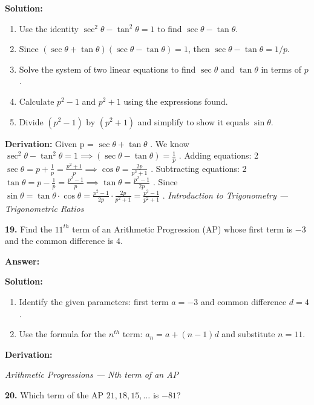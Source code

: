 \documentclass[12pt,a4paper]{exam}
\newcommand{\fitmath}[1]{%
  \sbox{\schmathbox}{$\displaystyle #1$}%
  \ifdim\wd\schmathbox>\linewidth
    \resizebox{\linewidth}{!}{\usebox{\schmathbox}}%
  \else
    \usebox{\schmathbox}%
  \fi}
\begin{document}
\begin{questions}
\textbf{Solution:}
\begin{enumerate}
  \item Use the identity $\sec^2 \theta - \tan^2 \theta = 1$ to find $\sec \theta - \tan \theta$.
  \item Since $(\sec \theta + \tan \theta)(\sec \theta - \tan \theta) = 1$, then $\sec \theta - \tan \theta = 1/p$.
  \item Solve the system of two linear equations to find $\sec \theta$ and $\tan \theta$ in terms of $p$.
  \item Calculate $p^2 - 1$ and $p^2 + 1$ using the expressions found.
  \item Divide $(p^2 - 1)$ by $(p^2 + 1)$ and simplify to show it equals $\sin \theta$.
\end{enumerate}
\textbf{Derivation:}
Given  p = $\sec \theta + \tan \theta$ . We know  $\sec^2 \theta - \tan^2 \theta = 1 \implies (\sec \theta - \tan \theta) = \frac{1}{p}$ . Adding equations:  2$\sec \theta = p + \frac{1}{p} = \frac{p^2+1}{p} \implies \cos \theta = \frac{2p}{p^2+1}$ . Subtracting equations:  2$\tan \theta = p - \frac{1}{p} = \frac{p^2-1}{p} \implies \tan \theta = \frac{p^2-1}{2p}$ . Since  $\sin \theta = \tan \theta \cdot \cos \theta = \frac{p^2-1}{2p} \cdot \frac{2p}{p^2+1} = \frac{p^2-1}{p^2+1}$ .
\hfill \textit{Introduction to Trigonometry — Trigonometric Ratios}
\vspace{0.3cm}

\question \textbf{19.} Find the $11^{th}$ term of an Arithmetic Progression (AP) whose first term is $-3$ and the common difference is $4$.

\textbf{Answer:}
\begin{center}
\fitmath{37}
\end{center}

\textbf{Solution:}
\begin{enumerate}
  \item Identify the given parameters: first term $a = -3$ and common difference $d = 4$.
  \item Use the formula for the $n^{th}$ term: $a_n = a + (n-1)d$ and substitute $n=11$.
\end{enumerate}
\textbf{Derivation:}
\begin{center}
\fitmath{a_{11} = a + (11-1)d = -3 + 10(4) = -3 + 40 = 37}
\end{center}
\hfill \textit{Arithmetic Progressions — Nth term of an AP}
\vspace{0.3cm}

\question \textbf{20.} Which term of the AP $21, 18, 15, \dots$ is $-81$?


\end{questions}
\end{document}

